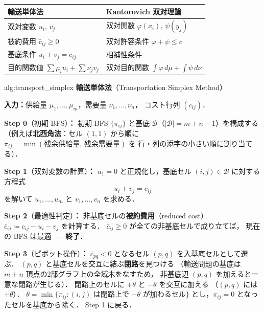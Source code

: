 \documentclass[uplatex, dvipdfmx]{jsarticle}
\begin{document}
\medskip
\begin{center}
{\renewcommand{\arraystretch}{1.4}
\begin{tabular}{ll}
  \hline
  \textbf{輸送単体法} & \textbf{Kantorovich 双対理論} \\
  \hline
  双対変数 $u_i,\,v_j$ & 双対関数 $\varphi(x_i),\,\psi(y_j)$ \\
  被約費用 $\bar{c}_{ij}\ge 0$ & 双対許容条件 $\varphi+\psi\le c$ \\
  基底条件 $u_i+v_j=c_{ij}$ & 相補性条件 \\
  目的関数値 $\sum\mu_i u_i+\sum\nu_j v_j$ & 双対目的関数 $\int\varphi\,d\mu+\int\psi\,d\nu$ \\
  \hline
\end{tabular}}
\end{center}

\begin{algorithm}{alg:transport_simplex}
\textbf{輸送単体法}（Transportation Simplex Method）

\medskip
\textbf{入力：}供給量 $\mu_1,\ldots,\mu_m$，需要量 $\nu_1,\ldots,\nu_n$，
コスト行列 $(c_{ij})$．

\medskip
\textbf{Step 0}（初期 BFS）\textbf{：}
初期 BFS $\{\pi_{ij}\}$ と基底 $\mathcal{B}$（$|\mathcal{B}|=m+n-1$）を構成する
（例えば\textbf{北西角法}：セル $(1,1)$ から順に
$\pi_{ij}=\min(\text{残余供給量},\,\text{残余需要量})$ を
行・列の添字の小さい順に割り当てる）．

\medskip
\textbf{Step 1}（双対変数の計算）\textbf{：}
$u_1=0$ と正規化し，基底セル $(i,j)\in\mathcal{B}$ に対する方程式
\[
  u_i + v_j = c_{ij}
\]
を解いて $u_1,\ldots,u_m$ と $v_1,\ldots,v_n$ を求める．

\medskip
\textbf{Step 2}（最適性判定）\textbf{：}
非基底セルの\textbf{被約費用}（reduced cost）
$\bar{c}_{ij} \coloneqq c_{ij} - u_i - v_j$
を計算する．
$\bar{c}_{ij}\ge 0$ が全ての非基底セルで成り立てば，
現在の BFS は最適——\textbf{終了}．

\medskip
\textbf{Step 3}（ピボット操作）\textbf{：}
$\bar{c}_{pq}<0$ となるセル $(p,q)$ を入基底セルとして選ぶ．
$(p,q)$ と基底セルを交互に結ぶ\textbf{閉路}を見つける
（輸送問題の基底は $m+n$ 頂点の2部グラフ上の全域木をなすため，
非基底辺 $(p,q)$ を加えると一意な閉路が生じる）．
閉路上のセルに $+\theta$ と $-\theta$ を交互に加える
（$(p,q)$ には $+\theta$）．
$\theta=\min\{\pi_{ij}: (i,j) \text{ は閉路上で } {-\theta} \text{ が加わるセル}\}$
とし，$\pi_{ij}=0$ となったセルを基底から除く．
Step 1 に戻る．
\end{algorithm}
\end{document}
